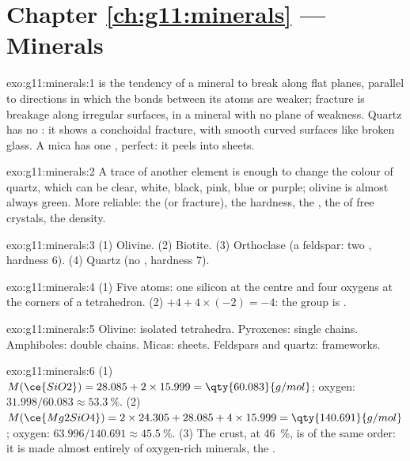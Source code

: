 \section*{Chapter \ref{ch:g11:minerals} --- Minerals}

\begin{solution}{exo:g11:minerals:1}
 is the tendency of a mineral to break along flat planes, parallel to
directions in which the bonds between its atoms are weaker; fracture is
breakage along irregular surfaces, in a mineral with no plane of weakness.
Quartz has no : it shows a conchoidal fracture, with smooth curved
surfaces like broken glass. A mica has one , perfect: it peels into
sheets.
\end{solution}

\begin{solution}{exo:g11:minerals:2}
A trace of another element is enough to change the colour of quartz, which
can be clear, white, black, pink, blue or purple; olivine is almost always
green. More reliable: the  (or fracture), the hardness, the ,
the  of free crystals, the density.
\end{solution}

\begin{solution}{exo:g11:minerals:3}
(1) Olivine. (2) Biotite. (3) Orthoclase (a feldspar: two , hardness
6). (4) Quartz (no , hardness 7).
\end{solution}

\begin{solution}{exo:g11:minerals:4}
(1) Five atoms: one silicon at the centre and four oxygens at the corners of
a tetrahedron. (2) $+4 + 4 \times (-2) = -4$: the group is .
\end{solution}

\begin{solution}{exo:g11:minerals:5}
Olivine: isolated tetrahedra. Pyroxenes: single chains. Amphiboles: double
chains. Micas: sheets. Feldspars and quartz: frameworks.
\end{solution}

\begin{solution}{exo:g11:minerals:6}
(1) $M(\ce{SiO2}) = 28.085 + 2 \times 15.999 = \qty{60.083}{g/mol}$;
oxygen: $31.998/60.083 \approx \qty{53.3}{\percent}$.
(2) $M(\ce{Mg2SiO4}) = 2 \times 24.305 + 28.085 + 4 \times 15.999 =
\qty{140.691}{g/mol}$; oxygen: $63.996/140.691 \approx \qty{45.5}{\percent}$.
(3) The crust, at \qty{46}{\percent}, is of the same order: it is made almost
entirely of oxygen-rich minerals, the .
\end{solution}

